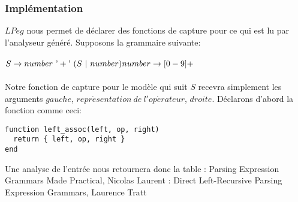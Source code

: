\documentclass{article}
\begin{document}
\subsubsection{Implémentation}
$LPeg$ nous permet de déclarer des fonctions de capture pour ce qui est lu par l'analyseur généré. Supposons la grammaire suivante: \\ \\
\begin{math}
S \rightarrow number \ \textrm{'}+\textrm{'} \ (S \ | \ number) \\
number \rightarrow [0-9]+
\end{math} \\ \\
Notre fonction de capture pour le modèle qui suit $S$ recevra simplement les arguments $gauche$, $repr\acute{e}sentation \ de \ l'op\acute{e}rateur$, $droite$. Déclarons d'abord la fonction comme ceci:
\begin{verbatim}
function left_assoc(left, op, right)
  return { left, op, right }
end
\end{verbatim}
Une analyse de l'entrée  \noindent nous retournera donc la table 
\newpage
\noindent[1]: Parsing Expression Grammars Made Practical, Nicolas Laurent \newline
[2]: Direct Left-Recursive Parsing Expression Grammars, Laurence Tratt
\end{document}
